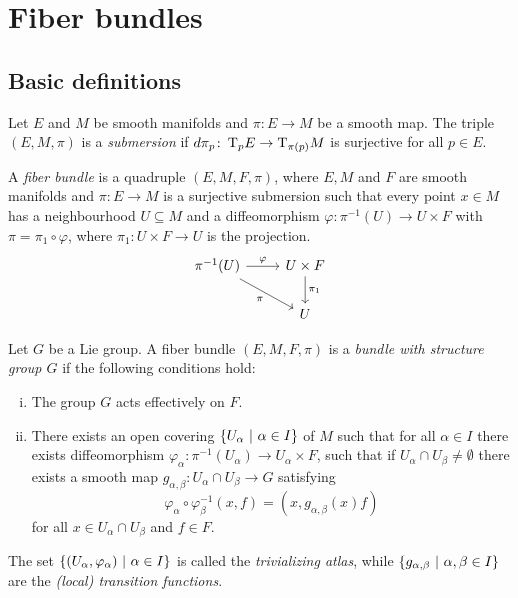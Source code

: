 \section{Fiber bundles}

\subsection{Basic definitions}

\begin{definicija}
Let $E$ and $M$ be smooth manifolds and $\pi \colon E \to M$ be a
smooth map. The triple $(E, M, \pi)$ is a
\emph{submersion} if
$d \pi_p \colon \operatorname{T}_p \! E \to \operatorname{T}_{\pi(p)} \! M$ is surjective
for all $p \in E$.
\end{definicija}


\begin{definicija}
A \emph{fiber bundle} is a quadruple
$(E, M, F, \pi)$, where $E, M$ and $F$ are smooth manifolds and
$\pi \colon E \to M$ is a surjective submersion such that every
point $x \in M$ has a neighbourhood $U \subseteq M$ and a
diffeomorphism $\varphi \colon \pi^{-1}(U) \to U \times F$ with
$\pi = \pi_1 \circ \varphi$, where $\pi_1 \colon U \times F \to U$
is the projection.
\[
\begin{tikzcd}
\pi^{-1}(U) \arrow[r, "\varphi"] \arrow[dr, "\pi"'] &
U \times F \arrow[d, "\pi_1"] \\ &
U
\end{tikzcd}
\]
\end{definicija}

\begin{definicija}
Let $G$ be a Lie group. A fiber bundle $(E, M, F, \pi)$ is a
\emph{bundle with structure group $G$}
if the following conditions hold:

\begin{enumerate}[i)]
\item The group $G$ acts effectively on $F$.
\item There exists an open covering $\left\{U_\alpha~\middle\vert~\alpha \in I\right\}$
of $M$ such that for all $\alpha \in I$ there exists 
diffeomorphism
$\varphi_\alpha \colon \pi^{-1}(U_\alpha) \to U_\alpha \times F$,
such that if $U_\alpha \cap U_\beta \ne \emptyset$ there exists a
smooth map $g_{\alpha, \beta} \colon U_\alpha \cap U_\beta \to G$
satisfying
\[
\varphi_\alpha \circ \varphi_\beta^{-1}(x,f) =
(x, g_{\alpha, \beta}(x) f)
\]
for all $x \in U_\alpha \cap U_\beta$ and $f \in F$.
\end{enumerate}

The set $\left\{\left(U_\alpha, \varphi_\alpha\right)~\middle\vert~\alpha \in I\right\}$ is
called the \emph{trivializing atlas},
while $\left\{g_{\alpha, \beta}~\middle\vert~\alpha, \beta \in I\right\}$ are the
\emph{(local) transition functions}.
\end{definicija}

